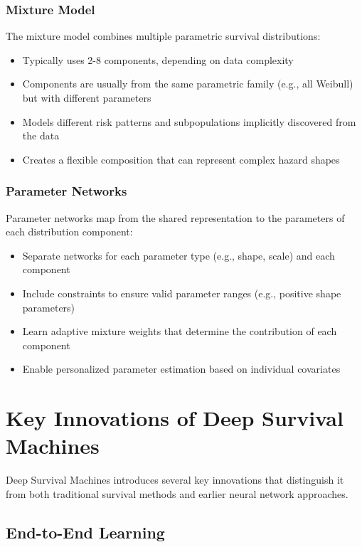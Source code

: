 \subsubsection{Mixture Model}

The mixture model combines multiple parametric survival distributions:
\begin{itemize}
    \item Typically uses 2-8 components, depending on data complexity
    \item Components are usually from the same parametric family (e.g., all Weibull) but with different parameters
    \item Models different risk patterns and subpopulations implicitly discovered from the data
    \item Creates a flexible composition that can represent complex hazard shapes
\end{itemize}

\subsubsection{Parameter Networks}

Parameter networks map from the shared representation to the parameters of each distribution component:
\begin{itemize}
    \item Separate networks for each parameter type (e.g., shape, scale) and each component
    \item Include constraints to ensure valid parameter ranges (e.g., positive shape parameters)
    \item Learn adaptive mixture weights that determine the contribution of each component
    \item Enable personalized parameter estimation based on individual covariates
\end{itemize}

\section{Key Innovations of Deep Survival Machines}

Deep Survival Machines introduces several key innovations that distinguish it from both traditional survival methods and earlier neural network approaches.

\subsection{End-to-End Learning}

